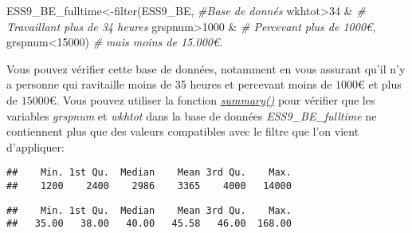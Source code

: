 \documentclass[
]{book}
\newenvironment{Shaded}{\begin{snugshade}}{\end{snugshade}}
\newcommand{\CommentTok}[1]{\textcolor[rgb]{0.56,0.35,0.01}{\textit{#1}}}
\newcommand{\DecValTok}[1]{\textcolor[rgb]{0.00,0.00,0.81}{#1}}
\newcommand{\FunctionTok}[1]{\textcolor[rgb]{0.00,0.00,0.00}{#1}}
\newcommand{\NormalTok}[1]{#1}
\newcommand{\OtherTok}[1]{\textcolor[rgb]{0.56,0.35,0.01}{#1}}
\newcommand{\SpecialCharTok}[1]{\textcolor[rgb]{0.00,0.00,0.00}{#1}}
\begin{document}
\begin{Shaded}
\begin{Highlighting}[]
\NormalTok{ESS9\_BE\_fulltime}\OtherTok{\textless{}{-}}\FunctionTok{filter}\NormalTok{(ESS9\_BE, }\CommentTok{\#Base de donnés}
\NormalTok{                   wkhtot}\SpecialCharTok{\textgreater{}}\DecValTok{34} \SpecialCharTok{\&} \CommentTok{\# Travaillant plus de 34 heures}
\NormalTok{                     grspnum}\SpecialCharTok{\textgreater{}}\DecValTok{1000} \SpecialCharTok{\&} \CommentTok{\# Percevant plus de 1000€,}
\NormalTok{                     grspnum}\SpecialCharTok{\textless{}}\DecValTok{15000}\NormalTok{) }\CommentTok{\# mais moins de 15.000€.}
\end{Highlighting}
\end{Shaded}

Vous pouvez vérifier cette base de données, notamment en vous assurant qu'il n'y a personne qui ravitaille moins de 35 heures et percevant moins de \(1000€\) et plus de \(15000€\). Vous pouvez utiliser la fonction \href{https://www.rdocumentation.org/packages/base/versions/3.6.2/topics/summary}{\emph{summary()}} pour vérifier que les variables \emph{grspnum} et \emph{wkhtot} dans la base de données \emph{ESS9\_BE\_fulltime} ne contiennent plus que des valeurs compatibles avec le filtre que l'on vient d'appliquer:

\begin{Shaded}
\end{Shaded}

\begin{verbatim}
##    Min. 1st Qu.  Median    Mean 3rd Qu.    Max. 
##    1200    2400    2986    3365    4000   14000
\end{verbatim}

\begin{Shaded}
\end{Shaded}

\begin{verbatim}
##    Min. 1st Qu.  Median    Mean 3rd Qu.    Max. 
##   35.00   38.00   40.00   45.58   46.00  168.00
\end{verbatim}
\end{document}
